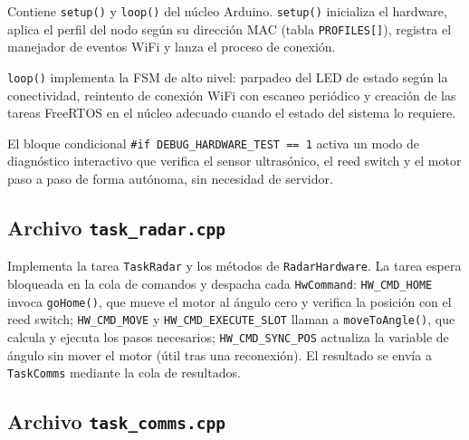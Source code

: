 Contiene \texttt{setup()} y \texttt{loop()} del núcleo Arduino. \texttt{setup()} inicializa
el hardware, aplica el perfil del nodo según su dirección MAC (tabla \texttt{PROFILES[]}),
registra el manejador de eventos WiFi y lanza el proceso de conexión.

\texttt{loop()} implementa la FSM de alto nivel: parpadeo del LED de estado según la
conectividad, reintento de conexión WiFi con escaneo periódico y creación de las tareas
FreeRTOS en el núcleo adecuado cuando el estado del sistema lo requiere.

El bloque condicional \texttt{\#if~DEBUG\_HARDWARE\_TEST~==~1} activa un modo de
diagnóstico interactivo que verifica el sensor ultrasónico, el reed switch y el motor paso
a paso de forma autónoma, sin necesidad de servidor.



\subsection{Archivo \texttt{task\_radar.cpp}}

Implementa la tarea \texttt{TaskRadar} y los métodos de \texttt{RadarHardware}. La tarea
espera bloqueada en la cola de comandos y despacha cada \texttt{HwCommand}: \texttt{HW\_CMD\_HOME}
invoca \texttt{goHome()}, que mueve el motor al ángulo cero y verifica la posición con el reed
switch; \texttt{HW\_CMD\_MOVE} y \texttt{HW\_CMD\_EXECUTE\_SLOT} llaman a \texttt{moveToAngle()},
que calcula y ejecuta los pasos necesarios; \texttt{HW\_CMD\_SYNC\_POS} actualiza la
variable de ángulo sin mover el motor (útil tras una reconexión). El resultado se envía a
\texttt{TaskComms} mediante la cola de resultados.



\subsection{Archivo \texttt{task\_comms.cpp}}

